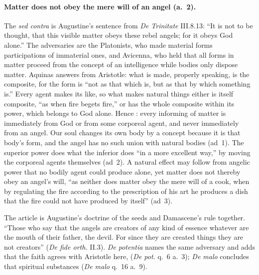 \paragraph{Matter does not obey the mere will of an angel (a.~2).} The
\emph{sed contra} is Augustine's sentence from \emph{De Trinitate} III.8.13:
``It is not to be thought, that this visible matter obeys these rebel
angels; for it obeys God alone.'' The adversaries are the Platonists, who
made material forms participations of immaterial ones, and Avicenna, who
held that all forms in matter proceed from the concept of an intelligence
while bodies only dispose matter. Aquinas answers from Aristotle: what is
made, properly speaking, is the composite, for the form is ``not as that
which is, but as that by which something is.'' Every agent makes its like,
so what makes natural things either is itself composite, ``as when fire
begets fire,'' or has the whole composite within its power, which belongs
to God alone. Hence : every informing of matter is immediately from God or from some
corporeal agent, and never immediately from an angel. Our soul changes its
own body by a concept because it is that body's form, and the angel has no
such union with natural bodies (ad~1). The superior power does what the
inferior does ``in a more excellent way,'' by moving the corporeal agents
themselves (ad~2). A natural effect may follow from angelic power that no
bodily agent could produce alone, yet matter does not thereby obey an
angel's will, ``as neither does matter obey the mere will of a cook, when
by regulating the fire according to the prescription of his art he
produces a dish that the fire could not have produced by itself'' (ad~3).

The article is Augustine's doctrine of the seeds and Damascene's rule
together. ``Those who say that the angels are creators of any kind of
essence whatever are the mouth of their father, the devil. For since they
are created things they are not creators'' (\emph{De fide orth.} II.3).
\emph{De potentia} names the same adversary and adds that the faith agrees
with Aristotle here,  (\emph{De pot.} q.~6 a.~3); \emph{De malo}
concludes that spiritual substances  (\emph{De malo} q.~16 a.~9).

